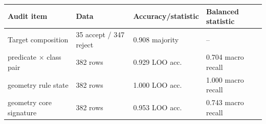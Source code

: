 \vspace{5pt}
\begin{center}
\centering
\small
\setlength{\tabcolsep}{5pt}
\begin{tabular}{llll}
\toprule
Audit item & Data & Accuracy/statistic & Balanced statistic \\
\midrule
Target composition & 35 accept / 347 reject & 0.908 majority & -- \\
predicate $\times$ class pair & 382 rows & 0.929 LOO acc. & 0.704 macro recall \\
geometry rule state & 382 rows & 1.000 LOO acc. & 1.000 macro recall \\
geometry core signature & 382 rows & 0.953 LOO acc. & 0.743 macro recall \\
\bottomrule
\end{tabular}
\label{tab:supp-support-audit}
\end{center}
